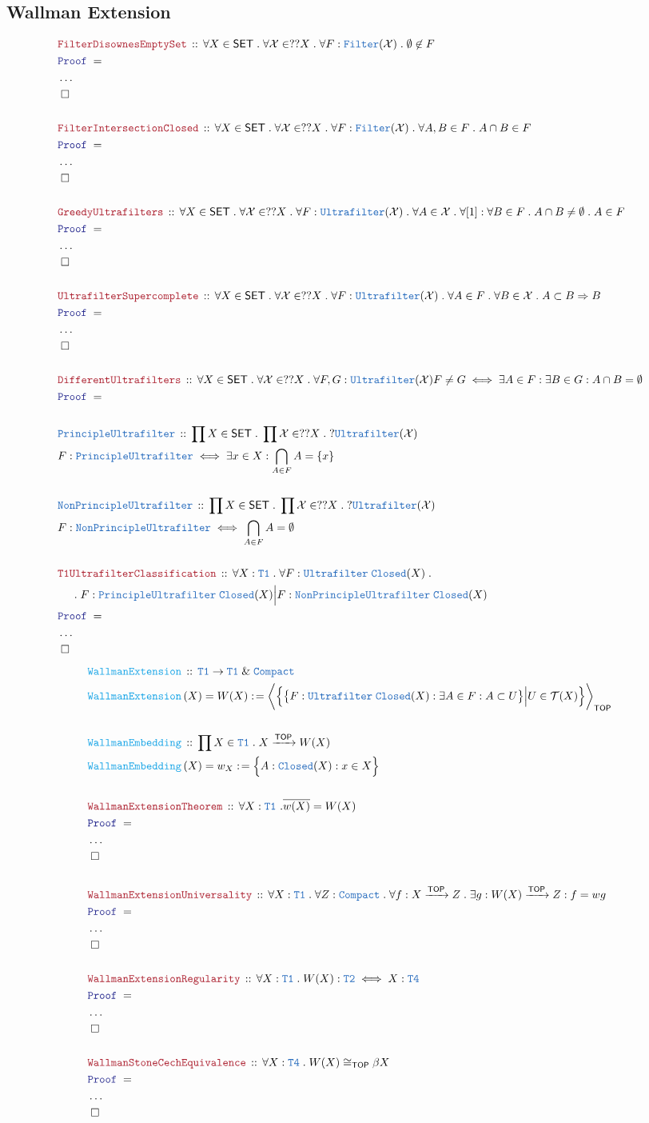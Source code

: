 \documentclass[12pt]{scrartcl}
\newcommand{\TYPE}[1]{\textcolor{NavyBlue}{\mathtt{#1}}}
\newcommand{\FUNC}[1]{\textcolor{Cerulean}{\mathtt{#1}}}
\newcommand{\LOGIC}[1]{\textcolor{Blue}{\mathtt{#1}}}
\newcommand{\THM}[1]{\textcolor{Maroon}{\mathtt{#1}}}
\renewcommand{\.}{\; . \;}
\newcommand{\de}{: \kern 0.1pc =}
\newcommand{\Act}[1]{\left( #1 \right)}
\newcommand{\Theorem}[2]{& \THM{#1} \, :: \, #2 \\ & \Proof = \\ }
\newcommand{\DeclareType}[2]{& \TYPE{#1} \, :: \, #2 \\}
\newcommand{\DefineType}[3]{& #1 : \TYPE{#2} \iff #3 \\}
\newcommand{\DeclareFunc}[2]{& \FUNC{#1} \, :: \, #2 \\}
\newcommand{\DefineNamedFunc}[4]{&  \FUNC{#1}\Act{#2} = #3 \de #4 \\}
\newcommand{\NewLine}{\\ & \kern 1pc}
\newcommand{\Page}[1]{ \begin{align*} #1 \end{align*}   }
\newcommand{\NoProof}{ & \ldots \\ \EndProof}
\renewcommand{\And}{\; \& \;}
\newcommand{\Imply}{\Rightarrow}
\newcommand{\Arrow}{\xrightarrow}
\newcommand{\QED}{\; \square}
\newcommand{\EndProof}{& \QED \\}
\newcommand{\Proof}{\LOGIC{Proof} \; }
\newcommand{\SET}{\mathsf{SET}}
\newcommand{\TOP}{\mathsf{TOP}}
\newcommand{\T}{\mathcal{T}}
\newcommand{\X}{\mathcal{X}}
\begin{document}
\subsection{Wallman Extension}
\Page{  
	\Theorem{FilterDisownesEmptySet}
	{
		\forall X \in  \SET \.
		\forall \X \in ??X \. 
		\forall F : \TYPE{Filter}(\X) \.
		\emptyset \not \in F 
	}
	\NoProof
	\\
	\Theorem{FilterIntersectionClosed}
	{
		\forall X \in  \SET \.
		\forall \X \in ??X \.
		\forall F : \TYPE{Filter}(\X) \.
		\forall A,B \in F \. A \cap B \in F 
	}
	\NoProof
	\\
	\Theorem{GreedyUltrafilters}
	{
		\forall X \in \SET \.
		\forall \X \in ??X \.
		\forall F : \TYPE{Ultrafilter}(\X) \.
		\forall A \in \X \.
		\forall [1] : \forall B \in F \. A \cap B \neq \emptyset \.
		A \in F 
	}
	\NoProof
	\\
	\Theorem{UltrafilterSupercomplete}
	{
		\forall X \in \SET \.
		\forall \X \in ??X \.
		\forall F : \TYPE{Ultrafilter}(\X) \.
		\forall A \in F \.
		\forall B \in \X \.
		 A \subset B \Imply B   
	}
	\NoProof
	\\
	\Theorem{DifferentUltrafilters}
	{
		\forall X \in \SET \.
		\forall \X \in ??X \.
		\forall F ,G : \TYPE{Ultrafilter}(\X)
		F \neq G \iff 
		\exists A \in F : \exists B \in G : A \cap B = \emptyset
	}
	\\
	\DeclareType{PrincipleUltrafilter}{\prod X \in \SET \. \prod \X \in ??X \. ?\TYPE{Ultrafilter}(\X)}
	\DefineType{F}{PrincipleUltrafilter}{ \exists x \in X :\bigcap_{A \in F} A = \{x\}   }
	\\
	\DeclareType{NonPrincipleUltrafilter}{\prod X \in \SET \. \prod \X \in ??X \. ?\TYPE{Ultrafilter}(\X) }
	\DefineType{F}{NonPrincipleUltrafilter}{\bigcap_{A \in F} A = \emptyset}
	\\
	\Theorem{T1UltrafilterClassification}{\forall X : \TYPE{T1} \. \forall F : \TYPE{Ultrafilter}\;\TYPE{Closed}(X) \.  \NewLine \.
		F : \TYPE{PrincipleUltrafilter}\;\TYPE{Closed}(X) \Big| F  : \TYPE{NonPrincipleUltrafilter}\;\TYPE{Closed}(X)  
	}
	\NoProof
}\Page{
	\DeclareFunc{WallmanExtension}{\TYPE{T1} \to \TYPE{T1} \And \TYPE{Compact}}
	\DefineNamedFunc{WallmanExtension}{X}{W(X)}{\bigg\langle \Big\{ \big\{ F : \TYPE{Ultrafilter}\;\TYPE{Closed}(X) : \exists A \in F : A \subset U   \big\} \Big| U \in \T(X)       \Big\} \bigg\rangle_{\TOP}}
	\\
	\DeclareFunc{WallmanEmbedding}{\prod X \in \TYPE{T1} \. X \Arrow{\TOP} W(X)}
	\DefineNamedFunc{WallmanEmbedding}{X}{w_X}{\Big\{ A : \TYPE{Closed}(X) : x \in X  \Big\}}
	\\
	\Theorem{WallmanExtensionTheorem}
	{
		\forall X : \TYPE{T1} \ . \overline{w(X)} = W(X)
	}
	\NoProof
	\\
	\Theorem{WallmanExtensionUniversality}
	{
		\forall X : \TYPE{T1} \. 
		\forall Z : \TYPE{Compact} \.
		\forall f : X \Arrow{\TOP} Z \.
		\exists g : W(X) \Arrow{\TOP} Z :
		f = wg              
	}
	\NoProof
	\\
	\Theorem{WallmanExtensionRegularity}
	{
		\forall X : \TYPE{T1} \.
		W(X) : \TYPE{T2} \iff  X : \TYPE{T4}
	}
	\NoProof
	\\
	\Theorem{WallmanStoneCechEquivalence}
	{
		\forall X : \TYPE{T4} \. W(X) \cong_{\TOP} \beta X  
           }
           \NoProof
}
\newpage
\end{document}
